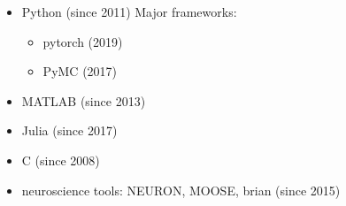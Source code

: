 %
%






\begin{itemize}
    \item Python (since 2011) Major frameworks:
        \begin{itemize}
            \item pytorch (2019)
            \item PyMC (2017) 
        \end{itemize}
    \item MATLAB (since 2013)
    \item Julia (since 2017)
    \item C (since 2008)
    \item neuroscience tools: NEURON, MOOSE, brian (since 2015)
\end{itemize}

